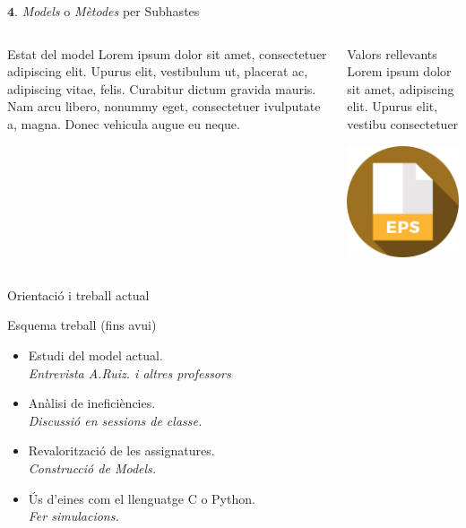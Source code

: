 \documentclass[twocolumn]{beamer}
\begin{document}
\begin{frame}{$\mathbf 4.$ \textit{Models} o \textit{Mètodes} per Subhastes}
\begin{columns}[t]
	\begin{column}{.5\textwidth}
		\begin{block}{Estat del model}
			Lorem ipsum dolor sit amet,
			consectetuer adipiscing elit. Upurus elit, vestibulum ut,
			placerat ac, adipiscing vitae,
			felis. Curabitur dictum gravida
			mauris. Nam arcu libero,
			nonummy eget, consectetuer ivulputate a, magna. Donec
			vehicula augue eu neque.
		\end{block}
	\end{column}
	\begin{column}{.5\textwidth}
		\begin{block}{Valors rellevants}
			Lorem ipsum dolor sit amet,
			adipiscing elit. Upurus elit, vestibu
			consectetuer 
		\end{block}
		\includegraphics[width=3.5cm]{eps}
	\end{column}
\end{columns}
\end{frame}
%
%
%
%
%
%
%
%
%
%
%
%
\begin{frame}{Orientació i treball actual}
\begin{box1}{\normalsize Esquema treball (fins avui)}
\begin{itemize}
	\item Estudi del model actual.
	\\\textit{\color{redviolet} Entrevista A.Ruiz. i altres professors }
	\item Anàlisi de ineficiències.
	\\\textit{\color{redviolet} Discussió en sessions de classe.}
	\item Revalorització de les assignatures.
	\\\textit{\color{redviolet} Construcció de Models.}
	\item Ús d’eines com el llenguatge C o Python.
	\\\textit{\color{redviolet} Fer simulacions.}
\end{itemize}
\end{box1}

\end{frame}
\end{document}
